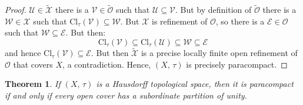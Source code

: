 \documentclass{article}
\theoremstyle{plain}
\newtheorem{theorem}{Theorem}[section]
\theoremstyle{normal}
\begin{document}
\begin{proof}
            $\mathcal{U}\in\tilde{\mathcal{X}}$ there is a
            $\mathcal{V}\in\tilde{\mathcal{O}}$ such that
            $\mathcal{U}\subseteq\mathcal{V}$. But by definition of
            $\tilde{\mathcal{O}}$ there is a
            $\mathcal{W}\in\mathcal{X}$ such that
            $\textrm{Cl}_{\tau}(\mathcal{V})\subseteq\mathcal{W}$. But
            $\mathcal{X}$ is refinement of $\mathcal{O}$, so there is a
            $\mathcal{E}\in\mathcal{O}$ such that
            $\mathcal{W}\subseteq\mathcal{E}$. But then:
            \begin{equation}
                \textrm{Cl}_{\tau}(\mathcal{V})
                \subseteq\textrm{Cl}_{\tau}(\mathcal{U})
                \subseteq\mathcal{W}
                \subseteq\mathcal{E}
            \end{equation}
            and hence $\textrm{Cl}_{\tau}(\mathcal{V})\subseteq\mathcal{E}$.
            But then $\tilde{\mathcal{X}}$ is a precise locally finite open
            refinement of $\mathcal{O}$ that covers $X$, a contradiction. Hence,
            $(X,\,\tau)$ is precisely paracompact.
        \end{proof}
        \begin{theorem}
            If $(X,\,\tau)$ is a Hausdorff topological space, then it is
            paracompact if and only if every open cover has a subordinate
            partition of unity.
        \end{theorem}
\end{document}
